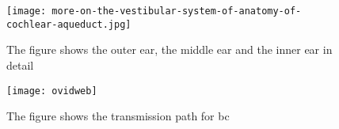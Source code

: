  \begin{figure}[H]
	\centering
		\texttt{[image: more-on-the-vestibular-system-of-anatomy-of-cochlear-aqueduct.jpg]}
		\caption{The figure shows the outer ear, the middle ear and the inner ear in detail}
		\label{fig:hearing_system_detail}
\end{figure}

 \begin{figure}[H]
	\centering
		\texttt{[image: ovidweb]}
		\caption{The figure shows the transmission path for \gls{bc} \citep{stenfelt_2005}}
		\label{fig:hearing_system_pathway}
\end{figure}

